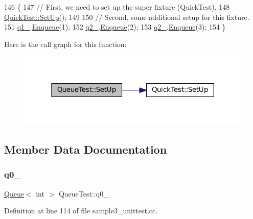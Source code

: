 \begin{DoxyCode}
146                        \{
147     \textcolor{comment}{// First, we need to set up the super fixture (QuickTest).}
148     \hyperlink{classQuickTest_ae52ad082887512b92240ce40a1a05650}{QuickTest::SetUp}();
149 
150     \textcolor{comment}{// Second, some additional setup for this fixture.}
151     \hyperlink{classQueueTest_a1e55594e71820ba0f1b09591fb328c30}{q1\_}.\hyperlink{classQueue_abaa2e7175457307bca74f5562cbdaaa9}{Enqueue}(1);
152     \hyperlink{classQueueTest_aeb7a2e3f6ce2d97d84eb1e01468adc2f}{q2\_}.\hyperlink{classQueue_abaa2e7175457307bca74f5562cbdaaa9}{Enqueue}(2);
153     \hyperlink{classQueueTest_aeb7a2e3f6ce2d97d84eb1e01468adc2f}{q2\_}.\hyperlink{classQueue_abaa2e7175457307bca74f5562cbdaaa9}{Enqueue}(3);
154   \}
\end{DoxyCode}
Here is the call graph for this function\+:
\nopagebreak
\begin{figure}[H]
\begin{center}
\leavevmode
\includegraphics[width=318pt]{classQueueTest_a91e69958f086239a523864d6b94ab174_cgraph}
\end{center}
\end{figure}


\subsection{Member Data Documentation}
\mbox{\label{classQueueTest_a0eba1fe2b31d75abd2df688ca5245e22}} 
\subsubsection{\texorpdfstring{q0\+\_\+}{q0\_}}
{\footnotesize\ttfamily \hyperlink{classQueue}{Queue}$<$ int $>$ Queue\+Test\+::q0\+\_\+\hspace{0.3cm}{\ttfamily [protected]}}



Definition at line 114 of file sample3\+\_\+unittest.\+cc.



